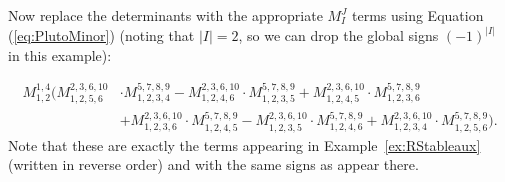 \begin{example}
Now replace the determinants with the appropriate $M^J_I$ terms using Equation (\ref{eq:PlutoMinor}) (noting that $|I| = 2$, so we can drop the global signs $(-1)^{|I|}$ in this example):

\begin{align*}M_{1,2}^{1,4}\Bigg( M_{1,2,5,6}^{2,3,6,10} &\cdot M_{1,2,3,4}^{5,7,8,9}
-M_{1,2,4,6}^{2,3,6,10}\cdot M_{1,2,3,5}^{5,7,8,9}
+M_{1,2,4,5}^{2,3,6,10}\cdot M_{1,2,3,6}^{5,7,8,9}\\
&+M_{1,2,3,6}^{2,3,6,10}\cdot M_{1,2,4,5}^{5,7,8,9} -M_{1,2,3,5}^{2,3,6,10}\cdot M_{1,2,4,6}^{5,7,8,9}+M_{1,2,3,4}^{2,3,6,10}\cdot M_{1,2,5,6}^{5,7,8,9}\Bigg).\end{align*}
Note that these are exactly the terms appearing in Example~\ref{ex:RStableaux} (written in reverse order) and with the same signs as appear there.
\end{example}




